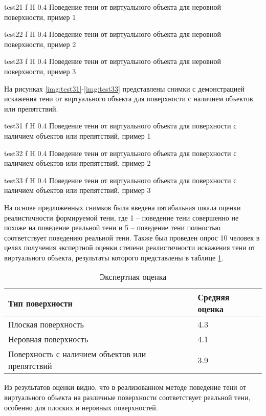 {test21}
{f}
{H}
{0.4\textwidth}
{Поведение тени от виртуального объекта для неровной поверхности, пример 1}

{test22}
{f}
{H}
{0.4\textwidth}
{Поведение тени от виртуального объекта для неровной поверхности, пример 2}

{test23}
{f}
{H}
{0.4\textwidth}
{Поведение тени от виртуального объекта для неровной поверхности, пример 3}

На рисунках \ref{img:test31}-\ref{img:test33} представлены снимки с демонстрацией искажения тени от виртуального объекта для поверхности с наличием объектов или препятствий.

{test31}
{f}
{H}
{0.4\textwidth}
{Поведение тени от виртуального объекта для поверхности с наличием объектов или препятствий, пример 1}

{test32}
{f}
{H}
{0.4\textwidth}
{Поведение тени от виртуального объекта для поверхности с наличием объектов или препятствий, пример 2}

{test33}
{f}
{H}
{0.4\textwidth}
{Поведение тени от виртуального объекта для поверхности с наличием объектов или препятствий, пример 3}

На основе предложенных снимков была введена пятибальная шкала оценки реалистичности формируемой тени, где 1 -- поведение тени совершенно не похоже на поведение реальной тени и 5 -- поведение тени полностью соответствует поведению реальной тени. Также был проведен опрос 10 человек в целях получения экспертной оценки степени реалистичности искажения тени от виртуального объекта, результаты которого представлены в таблице \ref{Otsenka}.

\begin{table}[H]
	\caption{Экспертная оценка}
	\label{Otsenka}
	\begin{center}
		\begin{tabular}{| p{8 cm} | p{3.5 cm} |} 
			\hline
			Тип поверхности & Средняя оценка \\
			\hline
			Плоская поверхность & 4.3 \\
			\hline
			Неровная поверхность & 4.1 \\
			\hline
			Поверхность с наличием объектов или препятствий & 3.9 \\
			\hline
		\end{tabular}
	\end{center}
\end{table}

Из результатов оценки видно, что в реализованном методе поведение тени от виртуального объекта на различные поверхности соответствует реальной тени, особенно для плоских и неровных поверхностей.

